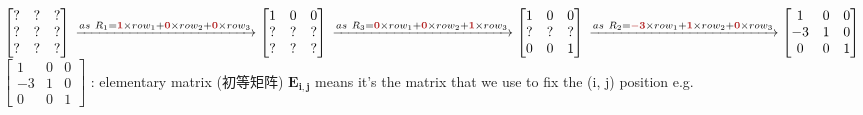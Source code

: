 \documentclass[12pt, a4paper]{article}
\begin{document}
\newline
\begin{math}
	\begin{bmatrix}
		? & ? & ? \\
		? & ? & ? \\
		? & ? & ? 
	\end{bmatrix}
	\\
	\xrightarrow[]{as \ R_1 = {\textcolor{anhao-scarlet}{\bf{1}}} \times row_1 + {\textcolor{anhao-scarlet}{\bf{0}}} \times row_2 + {\textcolor{anhao-scarlet}{\bf{0}}} \times row_3}
	\begin{bmatrix}
		1 & 0 & 0 \\
		? & ? & ? \\
		? & ? & ? 
	\end{bmatrix}
	\\
	\xrightarrow[]{as \ R_3 = {\textcolor{anhao-scarlet}{\bf{0}}} \times row_1 + {\textcolor{anhao-scarlet}{\bf{0}}} \times row_2 + {\textcolor{anhao-scarlet}{\bf{1}}} \times row_3}
	\begin{bmatrix}
		1 & 0 & 0 \\
		? & ? & ? \\
		0 & 0 & 1 
	\end{bmatrix}
	\\
	\xrightarrow[]{as \ R_2 = {\textcolor{anhao-scarlet}{\bf{-3}}} \times row_1 + {\textcolor{anhao-scarlet}{\bf{1}}} \times row_2 + {\textcolor{anhao-scarlet}{\bf{0}}} \times row_3}
	\begin{bmatrix}
		1 & 0 & 0 \\
		-3 & 1 & 0 \\
		0 & 0 & 1 
	\end{bmatrix}
\end{math}
\newline
\begin{math}
	\begin{bmatrix}
		1 & 0 & 0 \\
		-3 & 1 & 0 \\
		0 & 0 & 1 
	\end{bmatrix}
\end{math}
: elementary matrix (初等矩阵)
\newline
${\mathbf{E_{i,j}}}$ means it's the matrix that we use to fix the (i, j) position
\newline
e.g. 
\end{document}
